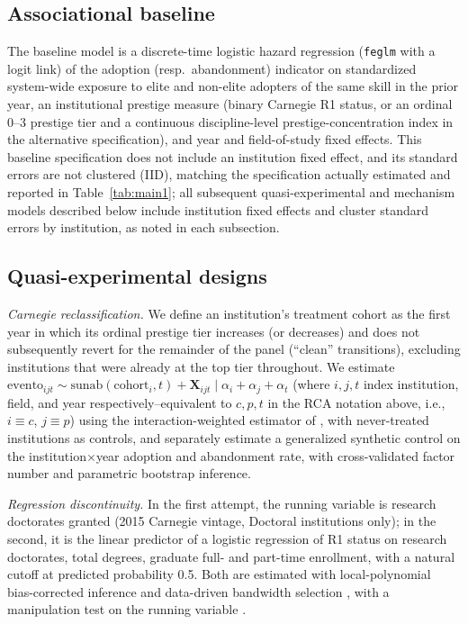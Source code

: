 \documentclass[11pt, letterpaper]{article}
\newcommand{\parencite}[1]{\cite{#1}}
\newcommand{\textcite}[1]{\cite{#1}}
\begin{document}
\subsection*{Associational baseline}

The baseline model is a discrete-time logistic hazard regression (\texttt{feglm} with a logit link) of the adoption (resp.\ abandonment) indicator on standardized system-wide exposure to elite and non-elite adopters of the same skill in the prior year, an institutional prestige measure (binary Carnegie R1 status, or an ordinal 0--3 prestige tier and a continuous discipline-level prestige-concentration index in the alternative specification), and year and field-of-study fixed effects. This baseline specification does not include an institution fixed effect, and its standard errors are not clustered (IID), matching the specification actually estimated and reported in Table~\ref{tab:main1}; all subsequent quasi-experimental and mechanism models described below include institution fixed effects and cluster standard errors by institution, as noted in each subsection.

\subsection*{Quasi-experimental designs}

\emph{Carnegie reclassification.} We define an institution's treatment cohort as the first year in which its ordinal prestige tier increases (or decreases) and does not subsequently revert for the remainder of the panel (``clean'' transitions), excluding institutions that were already at the top tier throughout. We estimate $\mathrm{evento}_{ijt} \sim \mathrm{sunab}(\mathrm{cohort}_i, t) + \mathbf{X}_{ijt} \mid \alpha_i + \alpha_j + \alpha_t$ (where $i, j, t$ index institution, field, and year respectively--equivalent to $c, p, t$ in the RCA notation above, i.e., $i \equiv c$, $j \equiv p$) using the interaction-weighted estimator of \textcite{sunabraham2021}, with never-treated institutions as controls, and separately estimate a generalized synthetic control \parencite{xu2017} on the institution$\times$year adoption and abandonment rate, with cross-validated factor number and parametric bootstrap inference.

\emph{Regression discontinuity.} In the first attempt, the running variable is research doctorates granted (2015 Carnegie vintage, Doctoral institutions only); in the second, it is the linear predictor of a logistic regression of R1 status on research doctorates, total degrees, graduate full- and part-time enrollment, with a natural cutoff at predicted probability 0.5. Both are estimated with local-polynomial bias-corrected inference and data-driven bandwidth selection \parencite{calonico2014}, with a manipulation test on the running variable \parencite{cattaneo2020density}.
\end{document}
